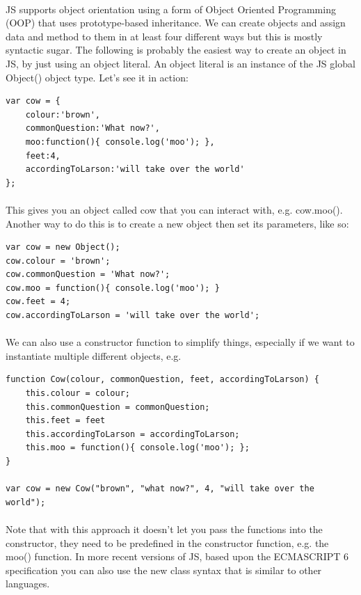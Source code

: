 \paragraph{} JS supports object orientation using a form of Object Oriented Programming (OOP) that uses prototype-based inheritance. We can create objects and assign data and method to them in at least four different ways but this is mostly syntactic sugar. The following is probably the easiest way to create an object in JS, by just using an object literal. An object literal is an instance of the JS global Object() object type. Let's see it in action:

\begin{lstlisting}
var cow = {
  	colour:'brown',
  	commonQuestion:'What now?',
  	moo:function(){ console.log('moo'); },
  	feet:4,
  	accordingToLarson:'will take over the world'
};
\end{lstlisting}

\paragraph{} This gives you an object called cow that you can interact with, e.g. cow.moo(). Another way to do this is to create a new object then set its parameters, like so:

\begin{lstlisting}
var cow = new Object();
cow.colour = 'brown';
cow.commonQuestion = 'What now?';
cow.moo = function(){ console.log('moo'); }
cow.feet = 4;
cow.accordingToLarson = 'will take over the world';
\end{lstlisting}

\paragraph{} We can also use a constructor function to simplify things, especially if we want to instantiate multiple different objects, e.g.

\begin{lstlisting}
function Cow(colour, commonQuestion, feet, accordingToLarson) {
	this.colour = colour;
	this.commonQuestion = commonQuestion;
	this.feet = feet
	this.accordingToLarson = accordingToLarson;
	this.moo = function(){ console.log('moo'); };
}

var cow = new Cow("brown", "what now?", 4, "will take over the world");
\end{lstlisting}

\paragraph{} Note that with this approach it doesn't let you pass the functions into the constructor, they need to be predefined in the constructor function, e.g. the moo() function. In more recent versions of JS, based upon the ECMASCRIPT 6 specification you can also use the new class syntax that is similar to other languages.

